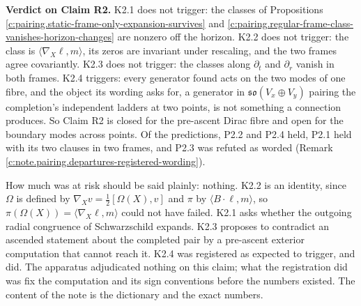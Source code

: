 \documentclass[11pt]{article}
\theoremstyle{definition}
\theoremstyle{plain}
\providecommand{\pv}{}\renewcommand{\pv}{\pi}
\providecommand{\so}{}\renewcommand{\so}{\mathfrak{so}}
\providecommand{\ip}{}\renewcommand{\ip}[2]{\langle #1, #2\rangle}
\begin{document}
\label{c:note.pairing.setting-what-does-two-claims}
\textbf{Verdict on Claim R2.} K2.1 does not trigger: the classes of Propositions \ref{c:pairing.static-frame-only-expansion-survives} and \ref{c:pairing.regular-frame-class-vanishes-horizon-changes} are nonzero off the horizon. K2.2 does not trigger: the class is $\ip{\nabla_{X}\ell}{m}$, its zeros are invariant under rescaling, and the two frames agree covariantly. K2.3 does not trigger: the classes along $\partial_{t}$ and $\partial_{r}$ vanish in both frames. K2.4 triggers: every generator found acts on the two modes of one fibre, and the object its wording asks for, a generator in $\so(V_{x} \oplus V_{y})$ pairing the completion's independent ladders at two points, is not something a connection produces. So Claim R2 is closed for the pre-ascent Dirac fibre and open for the boundary modes across points. Of the predictions, P2.2 and P2.4 held, P2.1 held with its two clauses in two frames, and P2.3 was refuted as worded (Remark \ref{c:note.pairing.departures-registered-wording}).

How much was at risk should be said plainly: nothing. K2.2 is an identity, since $\Omega$ is defined by $\nabla_{X}v = \tfrac12[\Omega(X), v]$ and $\pv$ by $\ip{B\cdot\ell}{m}$, so $\pv(\Omega(X)) = \ip{\nabla_{X}\ell}{m}$ could not have failed. K2.1 asks whether the outgoing radial congruence of Schwarzschild expands. K2.3 proposes to contradict an ascended statement about the completed pair by a pre-ascent exterior computation that cannot reach it. K2.4 was registered as expected to trigger, and did. The apparatus adjudicated nothing on this claim; what the registration did was fix the computation and its sign conventions before the numbers existed. The content of the note is the dictionary and the exact numbers.
\end{document}
